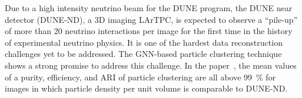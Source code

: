 \documentclass{ws-rv9x6}
\begin{document}
Due to a high intensity neutrino beam for the DUNE program, the DUNE near detector (DUNE-ND), a 3D imaging LArTPC, is expected to observe a ``pile-up'' of more than 20 neutrino interactions per image for the first time in the history of experimental neutrino physics. It is one of the hardest data reconstruction challenges yet to be addressed. The GNN-based particle clustering technique shows a strong promise to address this challenge. In the paper~\cite{drielsma2020clustering}, the mean values of a purity, efficiency, and ARI of particle clustering are all above 99~\% for images in  which particle density per unit volume is comparable to DUNE-ND. 






\end{document}
